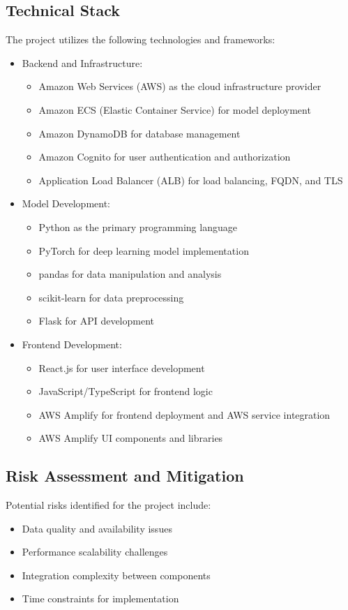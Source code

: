 \documentclass[12pt]{article}
\begin{document}
\clearpage  %
\subsection{Technical Stack}
The project utilizes the following technologies and frameworks:
\begin{itemize}
    \item Backend and Infrastructure:
    \begin{itemize}
        \item Amazon Web Services (AWS) as the cloud infrastructure provider
        \item Amazon ECS (Elastic Container Service) for model deployment
        \item Amazon DynamoDB for database management
        \item Amazon Cognito for user authentication and authorization
        \item Application Load Balancer (ALB) for load balancing, FQDN, and TLS
    \end{itemize}
    \item Model Development:
    \begin{itemize}
        \item Python as the primary programming language
        \item PyTorch for deep learning model implementation
        \item pandas for data manipulation and analysis
        \item scikit-learn for data preprocessing
        \item Flask for API development
    \end{itemize}
    \item Frontend Development:
    \begin{itemize}
        \item React.js for user interface development
        \item JavaScript/TypeScript for frontend logic
        \item AWS Amplify for frontend deployment and AWS service integration
        \item AWS Amplify UI components and libraries
    \end{itemize}
\end{itemize}

\subsection{Risk Assessment and Mitigation}
Potential risks identified for the project include:
\begin{itemize}
    \item Data quality and availability issues
    \item Performance scalability challenges
    \item Integration complexity between components
    \item Time constraints for implementation
\end{itemize}
\end{document}

